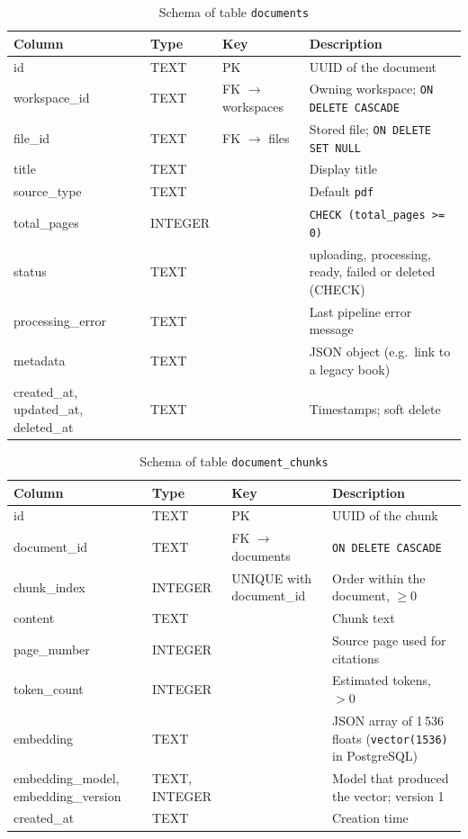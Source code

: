 \begin{table}[htbp]
\centering\small
\caption{Schema of table \texttt{documents}}\label{tab:schema_documents}
\begin{tabularx}{\textwidth}{@{}>{\raggedright\arraybackslash}p{} >{\raggedright\arraybackslash}p{} >{\raggedright\arraybackslash}p{} >{\raggedright\arraybackslash}X@{}}
\toprule
\textbf{Column} & \textbf{Type} & \textbf{Key} & \textbf{Description}\\
\midrule
id & TEXT & PK & UUID of the document\\
workspace\_id & TEXT & FK $\rightarrow$ workspaces & Owning workspace; \texttt{ON DELETE CASCADE}\\
file\_id & TEXT & FK $\rightarrow$ files & Stored file; \texttt{ON DELETE SET NULL}\\
title & TEXT & & Display title\\
source\_type & TEXT & & Default \texttt{pdf}\\
total\_pages & INTEGER & & \texttt{CHECK (total\_pages >= 0)}\\
status & TEXT & & uploading, processing, ready, failed or deleted (CHECK)\\
processing\_error & TEXT & & Last pipeline error message\\
metadata & TEXT & & JSON object (e.g.\ link to a legacy book)\\
created\_at, updated\_at, deleted\_at & TEXT & & Timestamps; soft delete\\
\bottomrule
\end{tabularx}
\end{table}

\begin{table}[htbp]
\centering\small
\caption{Schema of table \texttt{document\_chunks}}\label{tab:schema_chunks}
\begin{tabularx}{\textwidth}{@{}>{\raggedright\arraybackslash}p{} >{\raggedright\arraybackslash}p{} >{\raggedright\arraybackslash}p{} >{\raggedright\arraybackslash}X@{}}
\toprule
\textbf{Column} & \textbf{Type} & \textbf{Key} & \textbf{Description}\\
\midrule
id & TEXT & PK & UUID of the chunk\\
document\_id & TEXT & FK $\rightarrow$ documents & \texttt{ON DELETE CASCADE}\\
chunk\_index & INTEGER & UNIQUE with document\_id & Order within the document, $\geq 0$\\
content & TEXT & & Chunk text\\
page\_number & INTEGER & & Source page used for citations\\
token\_count & INTEGER & & Estimated tokens, $> 0$\\
embedding & TEXT & & JSON array of 1\,536 floats (\texttt{vector(1536)} in PostgreSQL)\\
embedding\_model, embedding\_version & TEXT, INTEGER & & Model that produced the vector; version 1\\
created\_at & TEXT & & Creation time\\
\bottomrule
\end{tabularx}
\end{table}

